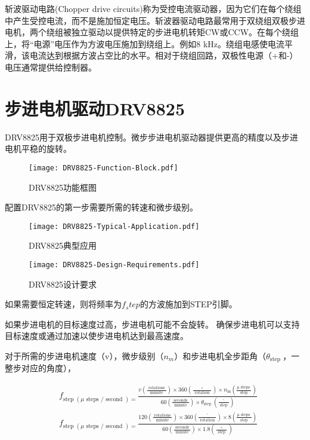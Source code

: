 斩波驱动电路(Chopper drive circuits)称为受控电流驱动器，因为它们在每个绕组中产生受控电流，而不是施加恒定电压。斩波器驱动电路最常用于双绕组双极步进电机，两个绕组被独立驱动以提供特定的步进电机转矩CW或CCW。在每个绕组上，将“电源”电压作为方波电压施加到绕组上。例如8 kHz。绕组电感使电流平滑，该电流达到根据方波占空比的水平。相对于绕组回路，双极性电源（+和-）电压通常提供给控制器。

\section{步进电机驱动DRV8825}

DRV8825用于双极步进电机控制。微步步进电机驱动器提供更高的精度以及步进电机平稳的旋转。

\begin{figure}[htbp]
    \centering
    \texttt{[image: DRV8825-Function-Block.pdf]}
    \caption{DRV8825功能框图}
    \label{fig:DRV8825-Function-Block}
\end{figure}

配置DRV8825的第一步需要所需的转速和微步级别。

\begin{figure}[htbp]
    \centering
    \texttt{[image: DRV8825-Typical-Application.pdf]}
    \caption{DRV8825典型应用}
    \label{fig:DRV8825-Typical-Application}
\end{figure}


\begin{figure}[htbp]
    \centering
    \texttt{[image: DRV8825-Design-Requirements.pdf]}
    \caption{DRV8825设计要求}
    \label{fig:DRV8825-Design-Requirements}
\end{figure}

如果需要恒定转速，则将频率为$f_step$的方波施加到STEP引脚。

如果步进电机的目标速度过高，步进电机可能不会旋转。 确保步进电机可以支持目标速度或通过加速以使步进电机达到最高速度。

对于所需的步进电机速度（v），微步级别（$n_m$）和步进电机全步距角（$\theta_{\text {step }}$，一整步对应的角度），

\begin{equation}
    \begin{aligned}
    &f_{\text {step }(\mu \text { steps } / \text { second })=} \frac{v\left(\frac{\text { rotations }}{\text { minute }}\right) \times 360\left(\frac{\circ}{\text { rotation }}\right) \times n_{\mathrm{m}}\left(\frac{\mu \text { steps }}{\text { step }}\right)}{60\left(\frac{\text { seconds }}{\text { minute }}\right) \times \theta_{\text {step }}\left(\frac{^{\circ}}{\text { step }}\right)}\\
    &f_{\text {step }(\mu \text { steps } / \text { second })=} \frac{120\left(\frac{\text { rotations }}{\text { minute }}\right) \times 360\left(\frac{^{\circ}}{\text { rotation }}\right) \times 8\left(\frac{\mu \text { steps }}{\text { step }}\right)}{60\left(\frac{\text { seconds }}{\text { minute }}\right) \times 1.8\left(\frac{\circ}{\text { step }}\right)}
    \end{aligned}
\end{equation}


